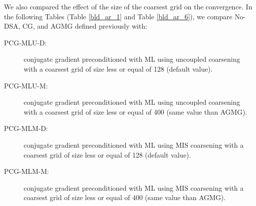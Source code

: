 We also compared the effect of the size of the coarsest grid on the convergence.
In the following Tables (Table \ref{bld_ar_1} and Table \ref{bld_ar_6}), we 
compare No-DSA, CG, and AGMG defined previously with:
\begin{description}
  \item[PCG-MLU-D:] conjugate gradient preconditioned with ML
    using uncoupled coarsening with a coarsest grid of size less 
    or equal of 128 (default value).
  \item[PCG-MLU-M:] conjugate gradient preconditioned with ML
    using uncoupled coarsening with a coarsest grid of size less 
    or equal of 400 (same value than AGMG).
  \item[PCG-MLM-D:] conjugate gradient preconditioned with ML
    using MIS coarsening with a coarsest grid of size less or 
    equal of 128 (default value).
  \item[PCG-MLM-M:] conjugate gradient preconditioned with ML
    using MIS coarsening with a coarsest grid of size less or 
    equal of 400 (same value than AGMG).
\end{description}
